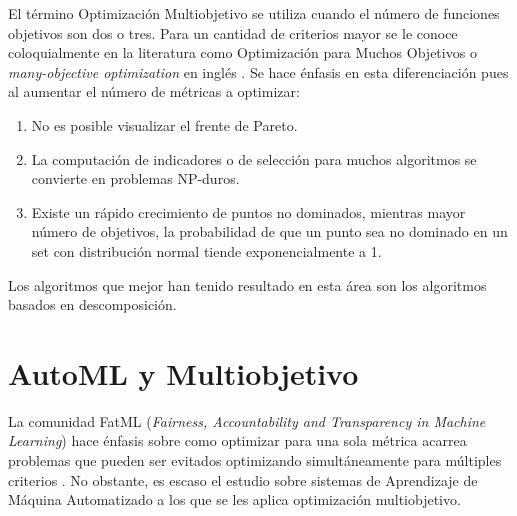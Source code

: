  El t\'ermino Optimizaci\'on Multiobjetivo se utiliza cuando el n\'umero de funciones objetivos son dos o tres. Para un cantidad de criterios mayor se le conoce coloquialmente en la literatura como Optimizaci\'on para Muchos Objetivos o \textit{many-objective optimization} en ingl\'es . Se hace \'enfasis en esta diferenciaci\'on pues al aumentar el n\'umero de m\'etricas a optimizar:
 \begin{enumerate}
     \item No es posible visualizar el frente de Pareto.
     \item La computaci\'on de indicadores o de selecci\'on para muchos algoritmos se convierte en problemas NP-duros.
     \item Existe un r\'apido crecimiento de puntos no dominados, mientras mayor n\'umero de objetivos, la probabilidad de que un punto sea no dominado en un set con distribuci\'on normal tiende exponencialmente a 1.
 \end{enumerate}

Los algoritmos que mejor han tenido resultado en esta \'area son los algoritmos basados en descomposici\'on.


\section{AutoML y Multiobjetivo}\label{background:mooautoml}

La comunidad FatML (\textit{Fairness, Accountability and Transparency in Machine Learning}) hace \'enfasis sobre como optimizar para una sola m\'etrica acarrea problemas que pueden ser evitados optimizando simult\'aneamente para m\'ultiples criterios . No obstante, es escaso el estudio sobre sistemas de Aprendizaje de M\'aquina Automatizado a los que se les aplica optimizaci\'on multiobjetivo.

